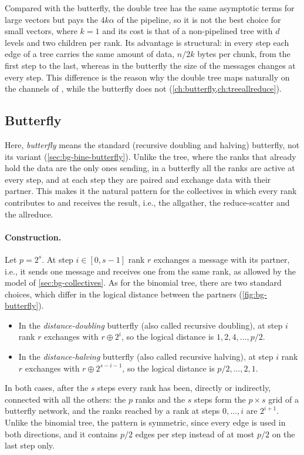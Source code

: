 Compared with the butterfly, the double tree has the same asymptotic terms for large vectors but pays the $4k\alpha$ of the pipeline, so it is not the best choice for small vectors, where $k=1$ and its cost is that of a non-pipelined tree with $d$ levels and two children per rank.
Its advantage is structural: in every step each edge of a tree carries the same amount of data, $n/2k$ bytes per chunk, from the first step to the last, whereas in the butterfly the size of the messages changes at every step.
This difference is the reason why the double tree maps naturally on the channels of \nccl{}, while the butterfly does not (\cref{ch:butterfly,ch:treeallreduce}).

\subsection{Butterfly}\label{sec:bg-butterfly}

Here, \emph{butterfly} means the standard (recursive doubling and halving) butterfly, not its \bine{} variant (\cref{sec:bg-bine-butterfly}).
Unlike the tree, where the ranks that already hold the data are the only ones sending, in a butterfly all the ranks are active at every step, and at each step they are paired and exchange data with their partner.
This makes it the natural pattern for the collectives in which every rank contributes to and receives the result, i.e., the allgather, the reduce-scatter and the allreduce.

\paragraph{Construction.}
Let $p=2^s$.
At step $i\in[0,s-1]$ rank $r$ exchanges a message with its partner, i.e., it sends one message and receives one from the same rank, as allowed by the model of \cref{sec:bg-collectives}.
As for the binomial tree, there are two standard choices, which differ in the logical distance between the partners (\cref{fig:bg-butterfly}).
\begin{itemize}
  \item In the \emph{distance-doubling} butterfly (also called recursive doubling), at step $i$ rank $r$ exchanges with $r\oplus2^{i}$, so the logical distance is $1,2,4,\dots,p/2$.
  \item In the \emph{distance-halving} butterfly (also called recursive halving), at step $i$ rank $r$ exchanges with $r\oplus2^{s-i-1}$, so the logical distance is $p/2,\dots,2,1$.
\end{itemize}
In both cases, after the $s$ steps every rank has been, directly or indirectly, connected with all the others: the $p$ ranks and the $s$ steps form the $p\times s$ grid of a butterfly network, and the ranks reached by a rank at steps $0,\dots,i$ are $2^{i+1}$.
Unlike the binomial tree, the pattern is symmetric, since every edge is used in both directions, and it contains $p/2$ edges per step instead of at most $p/2$ on the last step only.


